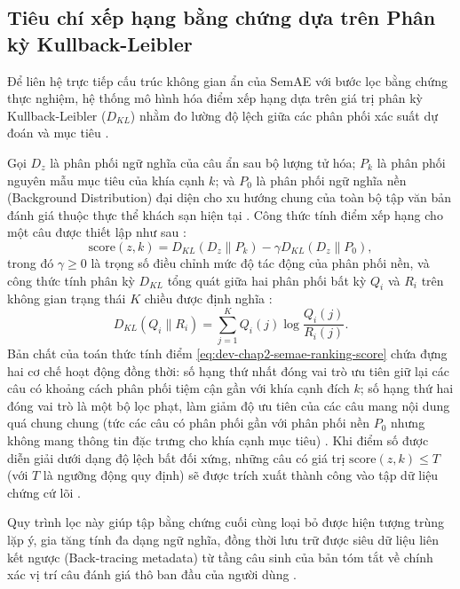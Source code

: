 \subsection{Tiêu chí xếp hạng bằng chứng dựa trên Phân kỳ Kullback-Leibler}
\label{subsec:dev-chap2-kl-ranking}

Để liên hệ trực tiếp cấu trúc không gian ẩn của SemAE với bước lọc bằng chứng thực nghiệm, hệ thống mô hình hóa điểm xếp hạng dựa trên giá trị phân kỳ Kullback-Leibler ($D_{KL}$) nhằm đo lường độ lệch giữa các phân phối xác suất dự đoán và mục tiêu \cite{angelidis2021extractive}.

Gọi $D_z$ là phân phối ngữ nghĩa của câu ẩn sau bộ lượng tử hóa; $P_k$ là phân phối nguyên mẫu mục tiêu của khía cạnh $k$; và $P_0$ là phân phối ngữ nghĩa nền (Background Distribution) đại diện cho xu hướng chung của toàn bộ tập văn bản đánh giá thuộc thực thể khách sạn hiện tại \cite{angelidis2021extractive}. Công thức tính điểm xếp hạng cho một câu được thiết lập như sau \cite{angelidis2021extractive}:
\begin{equation}
\mathrm{score}(z,k)=D_{KL}(D_z\|P_k)-\gamma D_{KL}(D_z\|P_0),
\label{eq:dev-chap2-semae-ranking-score}
\end{equation}
trong đó $\gamma \geq 0$ là trọng số điều chỉnh mức độ tác động của phân phối nền, và công thức tính phân kỳ $D_{KL}$ tổng quát giữa hai phân phối bất kỳ $Q_i$ và $R_i$ trên không gian trạng thái $K$ chiều được định nghĩa \cite{angelidis2021extractive}:
\begin{equation}
D_{KL}(Q_i\|R_i)=\sum_{j=1}^{K} Q_i(j)\log\frac{Q_i(j)}{R_i(j)}.
\label{eq:dev-chap2-kl-defined}
\end{equation}
Bản chất của toán thức tính điểm \eqref{eq:dev-chap2-semae-ranking-score} chứa đựng hai cơ chế hoạt động đồng thời: số hạng thứ nhất đóng vai trò ưu tiên giữ lại các câu có khoảng cách phân phối tiệm cận gần với khía cạnh đích $k$; số hạng thứ hai đóng vai trò là một bộ lọc phạt, làm giảm độ ưu tiên của các câu mang nội dung quá chung chung (tức các câu có phân phối gần với phân phối nền $P_0$ nhưng không mang thông tin đặc trưng cho khía cạnh mục tiêu) \cite{angelidis2021extractive}. Khi điểm số được diễn giải dưới dạng độ lệch bất đối xứng, những câu có giá trị $\mathrm{score}(z,k) \leq T$ (với $T$ là ngưỡng động quy định) sẽ được trích xuất thành công vào tập dữ liệu chứng cứ lõi \cite{angelidis2021extractive}.

Quy trình lọc này giúp tập bằng chứng cuối cùng loại bỏ được hiện tượng trùng lặp ý, gia tăng tính đa dạng ngữ nghĩa, đồng thời lưu trữ được siêu dữ liệu liên kết ngược (Back-tracing metadata) từ tầng câu sinh của bản tóm tắt về chính xác vị trí câu đánh giá thô ban đầu của người dùng \cite{angelidis2021extractive}.
